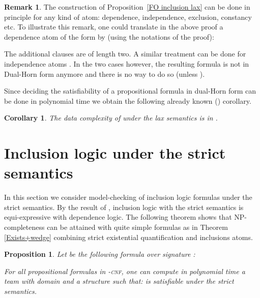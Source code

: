 \documentclass{article}
\theoremstyle{plain}
\newtheorem{corollary}[theorem]{Corollary}
\newtheorem{proposition}[theorem]{Proposition}
\theoremstyle{definition}
\newtheorem{remark}{Remark}
\newcommand{\pb}[1]{\textsc{#1}}
\begin{document}
 \begin{remark} 
The construction of Proposition~\ref{FO inclusion lax} can  be done in principle for any kind of atom: dependence, independence, exclusion, constancy etc. 
To illustrate this remark, one could translate in the above proof a dependence atom of the form  by (using the notations of the proof):
 

 
 The additional clauses are of length two. A similar treatment can be done for independence atoms .  In the two cases however, the resulting formula is not in Dual-Horn form anymore and there is no way to do so (unless ).
 \end{remark}
  
  
  Since deciding the satisfiability of a propositional formula in dual-Horn form can be done in polynomial time we obtain the following already known (\cite{gallhella13}) corollary.
  
\begin{corollary}
  The data complexity of  under the lax  semantics  is in .
  \end{corollary}
  



\section{Inclusion logic under the strict semantics}
In this  section we consider model-checking of inclusion logic formulas  under the strict semantics. By the result of \cite{galhankon13}, inclusion logic with the strict semantics is equi-expressive with dependence logic. The following theorem shows that NP-completeness can be attained with quite simple formulas as in Theorem \ref{Exists+wedge}  combining strict existential quantification and inclusions atoms.
\begin{proposition}\label{StrictInc1}
	Let  be the following formula over signature :
	
	For all propositional formulas  in -\pb{cnf}, one can compute in polynomial time a team  with domain  and a structure  such that:   is satisfiable   under the strict semantics.
\end{proposition}
\end{document}
